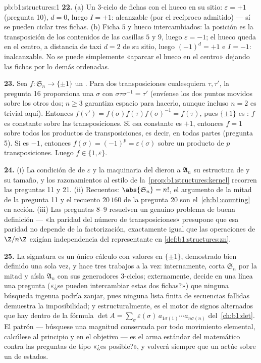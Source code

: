 \begin{solution}{pb:b1:structures:1}
\textbf{22.} (a) Un $3$-ciclo de fichas con el hueco en su sitio:
$\varepsilon = +1$ (pregunta 10), $d = 0$, luego $I = +1$: alcanzable
(por el recíproco admitido) --- sí se pueden ciclar tres fichas.
(b) Ficha $5$ y hueco intercambiados: la posición es la transposición
de los contenidos de las casillas $5$ y $9$, luego $\varepsilon = -1$;
el hueco queda en el centro, a distancia de taxi $d = 2$ de su sitio,
luego $(-1)^d = +1$ e $I = -1$: inalcanzable. No se puede simplemente
«aparcar el hueco en el centro» dejando las fichas por lo demás
ordenadas.

\textbf{23.} Sea $f \colon \mathfrak S_n \to \{\pm1\}$ un .
Para dos transposiciones cualesquiera $\tau, \tau'$, la pregunta 16
proporciona una $\sigma$ con $\sigma\tau\sigma^{-1} = \tau'$ (envíense
los dos puntos movidos sobre los otros dos; $n \geq 3$ garantiza
espacio para hacerlo, aunque incluso $n = 2$ es trivial aquí).
Entonces $f(\tau') = f(\sigma)f(\tau)f(\sigma)^{-1} = f(\tau)$, pues
$\{\pm1\}$ es : $f$ es constante sobre las transposiciones.
Si esa constante es $+1$, entonces $f = 1$ sobre todos los productos
de transposiciones, es decir, en todas partes (pregunta 5). Si es
$-1$, entonces $f(\sigma) = (-1)^p = \varepsilon(\sigma)$ sobre un
producto de $p$ transposiciones. Luego $f \in \{1, \varepsilon\}$.

\textbf{24.} (i) La condición de  de $\varepsilon$ y la
maquinaria del  dieron a $\mathfrak A_n$ su estructura de
 y su tamaño, y los razonamientos al estilo de
la~\cref{prop:b1:structures:kernel} recorren las preguntas 11 y 21.
(ii) Recuentos: $\abs{\mathfrak S_n} = n!$, el argumento de la mitad de
la pregunta 11 y el recuento $20\,160$ de la pregunta 20 son
el~\cref{ch:b1:counting} en acción. (iii) Las preguntas 8--9 resuelven
un genuino problema de buena definición --- «la paridad del número de
transposiciones» presupone que esa paridad no depende de la
factorización, exactamente igual que las operaciones de $\Z/n\Z$
exigían independencia del representante en \cref{def:b1:structures:zn}.

\textbf{25.} La signatura es un único cálculo con valores en
$\{\pm1\}$, demostrado bien definido una sola vez, y hace tres trabajos
a la vez: internamente, corta $\mathfrak S_n$ por la mitad y aísla
$\mathfrak A_n$ con sus generadores $3$-ciclos; externamente, decide en
una línea una pregunta («¿se pueden intercambiar estas dos fichas?»)
que ninguna búsqueda ingenua podría zanjar, pues ninguna lista finita
de secuencias fallidas demuestra la imposibilidad; y estructuralmente,
es el motor de signos alternados que hay dentro de la fórmula
$\det A = \sum_\sigma \varepsilon(\sigma)\, a_{1\sigma(1)}\cdots
a_{n\sigma(n)}$ del~\cref{ch:b1:det}. El patrón --- búsquese una
magnitud conservada por todo movimiento elemental, calcúlese al
principio y en el objetivo --- es el arma estándar del matemático
contra las preguntas de tipo «¿es posible?», y volverá siempre que un
 actúe sobre un  de estados.
\end{solution}
